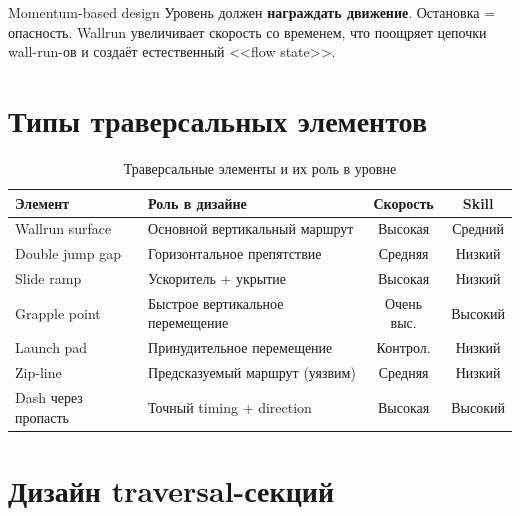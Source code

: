 \documentclass[a4paper,11pt]{report}
\begin{document}
\begin{principle}{Momentum-based design}
Уровень должен \textbf{награждать движение}. Остановка = опасность.
Wallrun увеличивает скорость со временем, что поощряет цепочки
wall-run-ов и создаёт естественный <<flow state>>.
\end{principle}

\section{Типы траверсальных элементов}

\begin{table}[H]
\centering
\caption{Траверсальные элементы и их роль в уровне}
\begin{tabularx}{\textwidth}{@{}lXcc@{}}
\toprule
\textbf{Элемент} & \textbf{Роль в дизайне} & \textbf{Скорость} & \textbf{Skill} \\
\midrule
Wallrun surface & Основной вертикальный маршрут & Высокая & Средний \\
Double jump gap & Горизонтальное препятствие & Средняя & Низкий \\
Slide ramp & Ускоритель + укрытие & Высокая & Низкий \\
Grapple point & Быстрое вертикальное перемещение & Очень выс. & Высокий \\
Launch pad & Принудительное перемещение & Контрол. & Низкий \\
Zip-line & Предсказуемый маршрут (уязвим) & Средняя & Низкий \\
Dash через пропасть & Точный timing + direction & Высокая & Высокий \\
\bottomrule
\end{tabularx}
\end{table}

\section{Дизайн traversal-секций}
\end{document}
